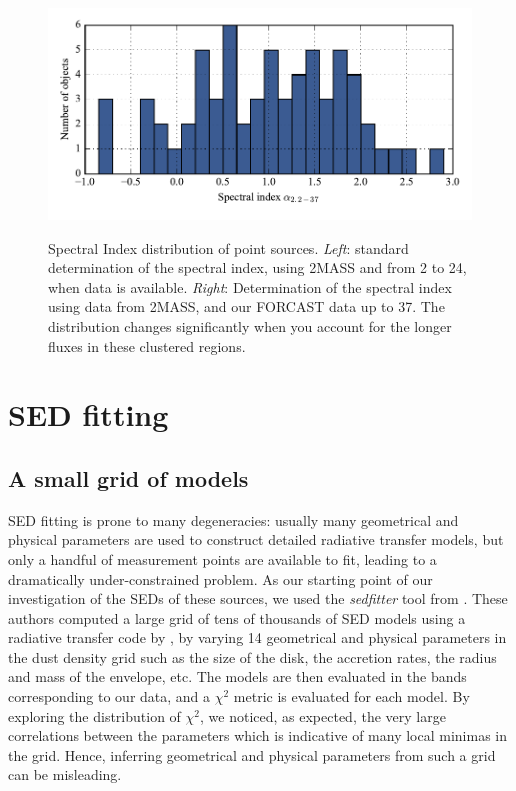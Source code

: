 \begin{figure}[!h]
\begin{center}
\includegraphics[width=\textwidth]{Figures/SpectralIndex.pdf}
\label{fig:SpectralIndex}
\vspace{-1cm}
\caption[Spectral Index distribution of point sources]{Spectral Index distribution of point sources. \textit{Left}: standard determination of the spectral index, using 2MASS and \Spitzer from \SI{2}{\micron} to \SI{24}{\micron}, when data is available. \textit{Right}: Determination of the spectral index using data from 2MASS, \Spitzer and our FORCAST data up to \SI{37}{\micron}. The distribution changes significantly when you account for the longer fluxes in these clustered regions.}
\end{center}
\end{figure}


\section{SED fitting}

\subsection{A small grid of models}

SED fitting is prone to many degeneracies: usually many geometrical and physical parameters are used to construct detailed radiative transfer models, but only a handful of measurement points are available to fit, leading to a dramatically under-constrained problem. As our starting point of our investigation of the SEDs of these sources, we used the \textit{sedfitter} tool from \citep{Robitaille:2006cb}. These authors computed a large grid of tens of thousands of SED models using a radiative transfer code by \citep{Whitney:2003ke}, by varying 14 geometrical and physical parameters in the dust density grid such as the size of the disk, the accretion rates, the radius and mass of the envelope, etc. The models are then evaluated in the bands corresponding to our data, and a $\chi^2$ metric is evaluated for each model. By exploring the distribution of $\chi^2$, we noticed, as expected, the very large correlations between the parameters which is indicative of many local minimas in the grid. Hence, inferring geometrical and physical parameters from such a grid can be misleading.

